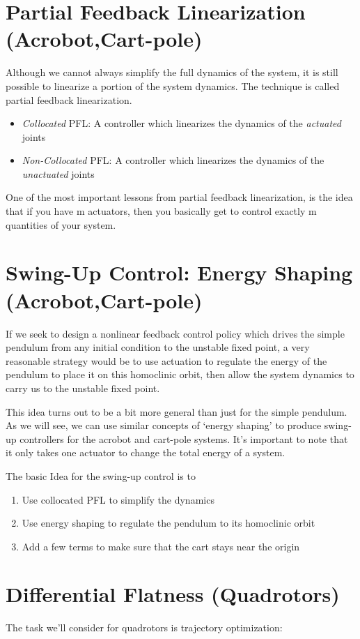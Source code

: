 \section{Partial Feedback Linearization (Acrobot,Cart-pole)}
Although we cannot always simplify the full dynamics of the system, it is still possible to linearize a portion of the system dynamics. The technique is called partial feedback linearization.
\begin{itemize}
\item \textit{Collocated} PFL: A controller which linearizes the dynamics of the \textit{actuated} joints
\item \textit{Non-Collocated} PFL: A controller which linearizes the dynamics of the \textit{unactuated} joints
\end{itemize}
One of the most important lessons from partial feedback linearization, is the idea that if you have m actuators, then you basically get to control exactly m quantities of your system.


\section{Swing-Up Control: Energy Shaping (Acrobot,Cart-pole)}
If we seek to design a nonlinear feedback control policy which drives the simple pendulum from any initial condition to the unstable fixed point, a very reasonable strategy would be to use actuation to regulate the energy of the pendulum to place it on this homoclinic orbit, then allow the system dynamics to carry us to the unstable fixed point.

This idea turns out to be a bit more general than just for the simple pendulum. As we will see, we can use similar concepts of `energy shaping' to produce swing-up controllers for the acrobot and cart-pole systems. It's important to note that it only takes one actuator to change the total energy of a system.

The basic Idea for the swing-up control is to
\begin{enumerate}
\item Use collocated PFL to simplify the dynamics
\item Use energy shaping to regulate the pendulum to its homoclinic orbit
\item Add a few terms to make sure that the cart stays near the origin
\end{enumerate}


\section{Differential Flatness (Quadrotors)}
The task we'll consider for quadrotors is trajectory optimization:


